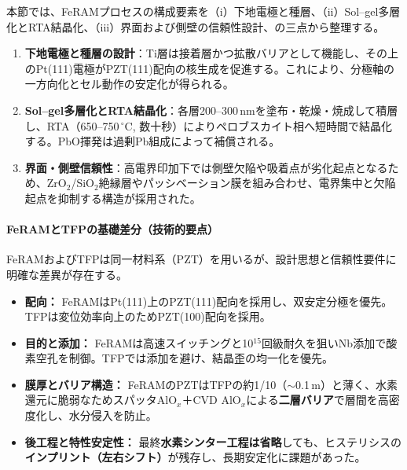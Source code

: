 \documentclass[conference]{IEEEtran}
\begin{document}
本節では、FeRAMプロセスの構成要素を（i）下地電極と種層、（ii）Sol--gel多層化とRTA結晶化、（iii）界面および側壁の信頼性設計、の三点から整理する。

\begin{enumerate}
  \item \textbf{下地電極と種層の設計}：Ti層は接着層かつ拡散バリアとして機能し、その上のPt(111)電極がPZT(111)配向の核生成を促進する。これにより、分極軸の一方向化とセル動作の安定化が得られる。
  \item \textbf{Sol--gel多層化とRTA結晶化}：各層200--300\,nmを塗布・乾燥・焼成して積層し、RTA（650--750\,$^\circ$C, 数十秒）によりペロブスカイト相へ短時間で結晶化する。PbO揮発は過剰Pb組成によって補償される。
  \item \textbf{界面・側壁信頼性}：高電界印加下では側壁欠陥や吸着点が劣化起点となるため、ZrO$_2$/SiO$_2$絶縁層やパッシベーション膜を組み合わせ、電界集中と欠陥起点を抑制する構造が採用された。
\end{enumerate}

\paragraph{FeRAMとTFPの基礎差分（技術的要点）}
FeRAMおよびTFPは同一材料系（PZT）を用いるが、設計思想と信頼性要件に明確な差異が存在する。
\begin{itemize}
  \item \textbf{配向：} FeRAMはPt(111)上のPZT(111)配向を採用し、双安定分極を優先。TFPは変位効率向上のためPZT(100)配向を採用。
  \item \textbf{目的と添加：} FeRAMは高速スイッチングと10$^{15}$回級耐久を狙いNb添加で酸素空孔を制御。TFPでは添加を避け、結晶歪の均一化を優先。
  \item \textbf{膜厚とバリア構造：} FeRAMのPZTはTFPの約1/10（$\sim$0.1\,\textmu m）と薄く、水素還元に脆弱なためスパッタAlO$_x$＋CVD AlO$_x$による\textbf{二層バリア}で層間を高密度化し、水分侵入を防止。
  \item \textbf{後工程と特性安定性：} 最終\textbf{水素シンター工程は省略}しても、ヒステリシスの\textbf{インプリント（左右シフト）}が残存し、長期安定化に課題があった。
\end{itemize}
\end{document}
